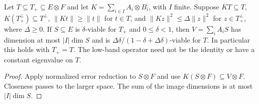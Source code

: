 \begin{lemma}
    \label{lem:viable_tensor_decomposition_sharp}
    \leanok
    Let $T\subseteq T_+\subseteq E\otimes F$ and let
    $K=\sum_{i\in I}A_i\otimes B_i$, with $I$ finite. Suppose
    $KT\subseteq T$, $K(T_+^\perp)\subseteq T^\perp$,
    $\|Kt\|\ge\|t\|$ for $t\in T$, and
    $\|Kz\|^2\le\Delta\|z\|^2$ for $z\in T_+^\perp$, where
    $\Delta\ge0$. If $S\subseteq E$ is $\delta$-viable for $T_+$ and
    $0\le\delta<1$, then $V=\sum_iA_iS$ has dimension at most
    $|I|\dim S$ and is $\Delta\delta/(1-\delta+\Delta\delta)$-viable
    for $T$. In particular this holds with $T_+=T$.
    The low-band operator need not be the identity or have a constant
    eigenvalue on $T$.
\end{lemma}
\begin{proof}\leanok
    Apply normalized error reduction to $S\otimes F$ and use
    $K(S\otimes F)\subseteq V\otimes F$. Closeness passes to the larger
    space. The sum of the image dimensions is at most $|I|\dim S$.
\end{proof}
